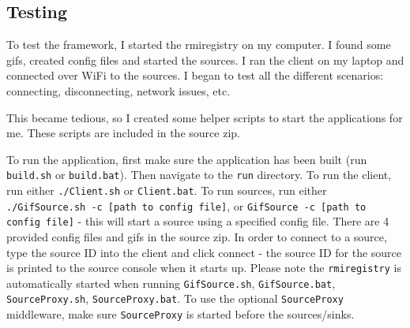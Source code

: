 \documentclass[a4paper]{article}
\begin{document}
\subsection{Testing}
To test the framework, I started the rmiregistry on my computer.
I found some gifs, created config files and started the sources.
I ran the client on my laptop and connected over WiFi to the sources.
I began to test all the different scenarios: connecting, disconnecting, network issues, etc.

This became tedious, so I created some helper scripts to start the applications for me.
These scripts are included in the source zip.

To run the application, first make sure the application has been built (run \texttt{build.sh} or \texttt{build.bat}).
Then navigate to the \texttt{run} directory.
To run the client, run either \texttt{./Client.sh} or \texttt{Client.bat}.
To run sources, run either \texttt{./GifSource.sh -c [path to config file]}, or \texttt{GifSource -c [path to config file]} - this will start a source using a specified config file.
There are 4 provided config files and gifs in the source zip.
In order to connect to a source, type the source ID into the client and click connect - the source ID for the source is printed to the source console when it starts up.
Please note the \texttt{rmiregistry} is automatically started when running \texttt{GifSource.sh}, \texttt{GifSource.bat}, \texttt{SourceProxy.sh}, \texttt{SourceProxy.bat}.
To use the optional \texttt{SourceProxy} middleware, make sure \texttt{SourceProxy} is started before the sources/sinks.

%
\end{document}
